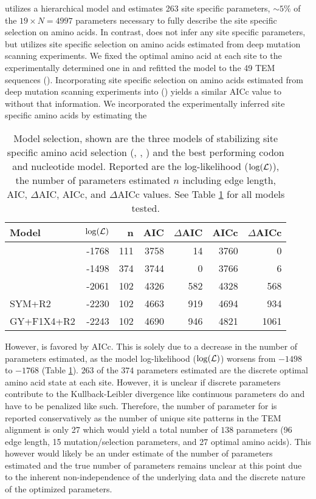 \selac utilizes a hierarchical model and estimates 263 site specific parameters, $\sim5\%$ of the $19\times N = 4997$ parameters necessary to fully describe the site specific selection on amino acids.
In contrast, \phydms does not infer any site specific parameters, but utilizes site specific selection on amino acids estimated from deep mutation scanning experiments.
We fixed the optimal amino acid at each site to the experimentally determined one in \selac and refitted the model to the 49 TEM sequences (\selacDMS).
Incorporating site specific selection on amino acids estimated from deep mutation scanning experiments into \selac (\selacDMS) yields a similar AICc value to \selac without that information.
We incorporated the experimentally inferred site specific amino acids by estimating the 

\begin{table}
  \centering
  \caption{Model selection, shown are the three models of stabilizing site specific amino acid selection (\selac, \selacDMS, \phydms) and the best performing codon and nucleotide model. 
  Reported are the log-likelihood ($\log(\mathcal{L})$), the number of parameters estimated $n$ including edge length, AIC, $\Delta$AIC, AICc, and $\Delta$AICc values.
  See Table \ref{tab:AIC} for all models tested.}  
  \begin{tabular}{lrrrrrr}
    \hline
    Model		& $\log(\mathcal{L})$ & n & AIC & $\Delta$AIC & AICc & $\Delta$AICc\\ \hline 
    \selacDMS 		& -1768 & 111& 3758& 14	& 3760  & 0\\
    \selac		& -1498 & 374& 3744&  0	& 3766  & 6 \\
    \phydms 		& -2061 & 102& 4326& 582& 4328 & 568\\
    SYM+R2 		& -2230 & 102& 4663& 919& 4694 & 934 \\
    GY+F1X4+R2 		& -2243 & 102& 4690& 946& 4821 & 1061 \\ \hline
  \end{tabular}
  \label{tab:AIC}
\end{table}

However, \selacDMS is favored by AICc.
This is solely due to a decrease in the number of parameters estimated, as the model log-likelihood ($\log(\mathcal{L})$) worsens from $-1498$ to $-1768$ (Table \ref{tab:AIC}).
$263$ of the $374$ parameters estimated are the discrete optimal amino acid state at each site. 
However, it is unclear if discrete parameters contribute to the Kullback-Leibler divergence like continuous parameters do and have to be penalized like such.
Therefore, the number of parameter for \selac is reported conservatively as the number of unique site patterns in the TEM alignment is only 27 which would yield a total number of $138$ parameters (96 edge length, 15 mutation/selection parameters, and 27 optimal amino acids).
This however would likely be an under estimate of the number of parameters estimated and the true number of parameters remains unclear at this point due to the inherent non-independence of the underlying data and the discrete nature of the optimized parameters.


